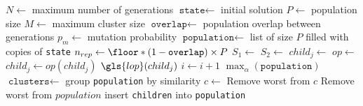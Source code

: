 \begin{algorithmic}[1]
	\Require $N\gets$ maximum number of generations
	\Require $\texttt{state} \gets$ initial solution
	\Require $P \gets$ population size
	\Require $M \gets$ maximum cluster size
	\Require $\texttt{overlap} \gets$ population overlap between generations
	\Require $p_m \gets$ mutation probability
	\State
		\State $\texttt{population}\gets$ list of size $P$ filled with copies of \texttt{state}
		\State $n_{rep}\gets\floor*{(1-\texttt{overlap})\times P}$ 
				\State $S_1\gets$ 
				\State $S_2\gets$ 
				\State $child_j \gets$ 
                    \State $op\gets$
                    \State $child_j\gets op(child_j)$
				\EndIf
                \State $\gls{lop}(child_j)$
			\EndFor
			\State {}
			\State $i\gets i+1$
		\EndWhile
        \State \Return $\max_{\alpha}(\texttt{population})$
	\EndProcedure
	\State
		\State $\texttt{clusters} \gets$ group \texttt{population} by similarity
			\State $c\gets$ 
				\State Remove worst from $c$
			\Else
				\State Remove worst from $population$
			\EndIf
		\EndFor
		\State insert \texttt{children} into \texttt{population}
	\EndFunction
\end{algorithmic}

